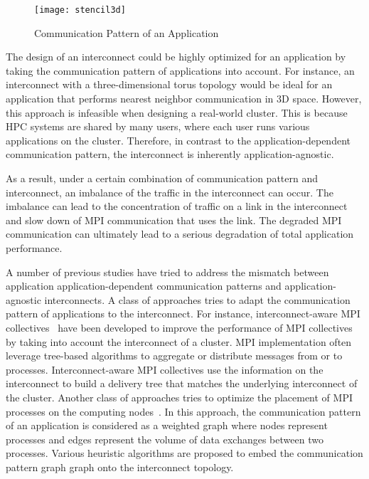 \begin{figure}
    \centering
    \texttt{[image: stencil3d]}
    \caption{Communication Pattern of an Application}%
    \label{fig:stencil3d}
\end{figure}

The design of an interconnect could be highly optimized for an
application by taking the communication pattern of applications into account.
For instance, an interconnect with a three-dimensional torus topology would be
ideal for an application that performs nearest neighbor communication in 3D
space. However, this approach is infeasible when designing a real-world
cluster. This is because HPC systems are shared by many users, where each user
runs various applications on the cluster. Therefore, in contrast to
the application-dependent communication pattern, the interconnect is
inherently application-agnostic.

As a result, under a certain combination of communication pattern and
interconnect, an imbalance of the traffic in the interconnect can occur. The
imbalance can lead to the concentration of traffic on a link in the
interconnect and slow down of MPI communication that uses the link. The
degraded MPI communication can ultimately lead to a serious degradation of
total application performance.

A  number of previous studies have tried to address the mismatch between
application application-dependent communication patterns and
application-agnostic interconnects. A class of approaches tries to adapt
the communication pattern of applications to the interconnect.
For instance, interconnect-aware MPI
collectives~\autocite{Kumar2016,Kumar2014,Gong2015,Adachi2013} have been
developed to improve the performance of MPI collectives by taking into account
the interconnect of a cluster. MPI implementation often leverage tree-based
algorithms to aggregate or distribute messages from or to processes.
Interconnect-aware MPI collectives use the information on the interconnect to
build a delivery tree that matches the underlying interconnect of the cluster.
Another class of approaches tries to optimize the placement of MPI processes
on the computing nodes~\autocite{Michelogiannakis2017,Hoefler2011,Choi2017}.
In this approach, the communication pattern of an application is considered as
a weighted graph where nodes represent processes and edges represent the
volume of data exchanges between two processes. Various heuristic algorithms
are proposed to embed the communication pattern graph graph onto the
interconnect topology.

